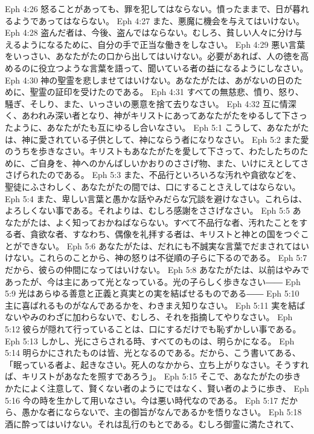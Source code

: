 Eph 4:26  怒ることがあっても、罪を犯してはならない。憤ったままで、日が暮れるようであってはならない。
Eph 4:27  また、悪魔に機会を与えてはいけない。
Eph 4:28  盗んだ者は、今後、盗んではならない。むしろ、貧しい人々に分け与えるようになるために、自分の手で正当な働きをしなさい。
Eph 4:29  悪い言葉をいっさい、あなたがたの口から出してはいけない。必要があれば、人の徳を高めるのに役立つような言葉を語って、聞いている者の益になるようにしなさい。
Eph 4:30  神の聖霊を悲しませてはいけない。あなたがたは、あがないの日のために、聖霊の証印を受けたのである。
Eph 4:31  すべての無慈悲、憤り、怒り、騒ぎ、そしり、また、いっさいの悪意を捨て去りなさい。
Eph 4:32  互に情深く、あわれみ深い者となり、神がキリストにあってあなたがたをゆるして下さったように、あなたがたも互にゆるし合いなさい。
Eph 5:1  こうして、あなたがたは、神に愛されている子供として、神にならう者になりなさい。
Eph 5:2  また愛のうちを歩きなさい。キリストもあなたがたを愛して下さって、わたしたちのために、ご自身を、神へのかんばしいかおりのささげ物、また、いけにえとしてささげられたのである。
Eph 5:3  また、不品行といろいろな汚れや貪欲などを、聖徒にふさわしく、あなたがたの間では、口にすることさえしてはならない。
Eph 5:4  また、卑しい言葉と愚かな話やみだらな冗談を避けなさい。これらは、よろしくない事である。それよりは、むしろ感謝をささげなさい。
Eph 5:5  あなたがたは、よく知っておかねばならない。すべて不品行な者、汚れたことをする者、貪欲な者、すなわち、偶像を礼拝する者は、キリストと神との国をつぐことができない。
Eph 5:6  あなたがたは、だれにも不誠実な言葉でだまされてはいけない。これらのことから、神の怒りは不従順の子らに下るのである。
Eph 5:7  だから、彼らの仲間になってはいけない。
Eph 5:8  あなたがたは、以前はやみであったが、今は主にあって光となっている。光の子らしく歩きなさい――
Eph 5:9  光はあらゆる善意と正義と真実との実を結ばせるものである――
Eph 5:10  主に喜ばれるものがなんであるかを、わきまえ知りなさい。
Eph 5:11  実を結ばないやみのわざに加わらないで、むしろ、それを指摘してやりなさい。
Eph 5:12  彼らが隠れて行っていることは、口にするだけでも恥ずかしい事である。
Eph 5:13  しかし、光にさらされる時、すべてのものは、明らかになる。
Eph 5:14  明らかにされたものは皆、光となるのである。だから、こう書いてある、「眠っている者よ、起きなさい。死人のなかから、立ち上がりなさい。そうすれば、キリストがあなたを照すであろう」。
Eph 5:15  そこで、あなたがたの歩きかたによく注意して、賢くない者のようにではなく、賢い者のように歩き、
Eph 5:16  今の時を生かして用いなさい。今は悪い時代なのである。
Eph 5:17  だから、愚かな者にならないで、主の御旨がなんであるかを悟りなさい。
Eph 5:18  酒に酔ってはいけない。それは乱行のもとである。むしろ御霊に満たされて、
